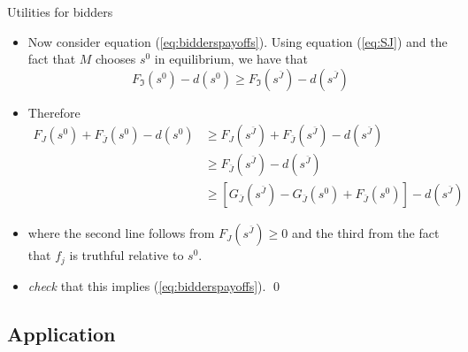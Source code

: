 \documentclass[11pt,english]{beamer}
\begin{document}
\begin{frame}[allowframebreaks]{Utilities for bidders}
\begin{itemize}
  \item Now consider equation (\ref{eq:bidderspayoffs}). Using
    equation (\ref{eq:SJ}) and the fact that $M$ chooses $s^0$ in
    equilibrium, we have that
    \begin{equation*}
      F_{\Im}(s^0)-d(s^0) \geq  F_{\Im}(s^{\bar{J}})-d(s^{\bar J})
    \end{equation*}
  \item Therefore
    \begin{align}
      F_{J}(s^0) + F_{\bar J}(s^0) -d(s^0) &\geq  F_{J}(s^{\bar{J}})+
      F_{\bar J}(s^{\bar{J}}) -d(s^{\bar J}) \\
      & \geq F_{\bar J}(s^{\bar{J}}) -d(s^{\bar J}) \\
      & \geq [G_{\bar J}(s^{\bar{J}})-G_{\bar J}(s^{0}) + F_{\bar J}(s^{0})] -d(s^{\bar J})
    \end{align}
  \item where the second line follows from $F_{J}(s^{\bar{J}}) \geq 0$
    and the third from the fact that $f_j$ is truthful relative to $s^0$.
  \item \emph{check} that this implies (\ref{eq:bidderspayoffs}). \qed
  \end{itemize}
\end{frame}

\subsection{Application}
\end{document}
